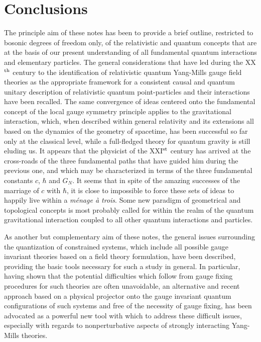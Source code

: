 \documentclass[a4paper,11pt]{article}
\begin{document}
\section{Conclusions}
\label{Sect9}

The principle aim of these notes has been to provide a brief outline,
restricted to bosonic degrees of freedom only, of the
relativistic and quantum concepts that are at the basis of our present
understanding of all fundamental quantum interactions and elementary
particles. The general considerations that have led during the XX$^{\rm th}$
century to the identification of relativistic quantum Yang-Mills gauge field
theories as the appropriate framework for a consistent causal and
quantum unitary description of relativistic quantum point-particles
and their interactions have been recalled. The same convergence of
ideas centered onto the fundamental concept of the local gauge
symmetry principle applies to the gravitational interaction, which,
when des\-cri\-bed within general relativity and its extensions all based
on the dynamics of the geometry of spacetime, has been successful so far
only at the classical level, while a full-fledged theory for quantum
gravity is still eluding us. It appears that the physicist of the 
XXI$^{\rm st}$ century has arrived at the cross-roads of the three fundamental
paths that have guided him during the previous one, and which may be
characterized in terms of the three fundamental constants $c$, $\hbar$ and
$G_N$. It seems that in spite of the amazing successes of the marriage
of $c$ with $\hbar$, it is close to impossible to force these sets of ideas 
to happily live within a {\sl m\'enage \`a trois\/}. Some new paradigm
of geometrical and topological concepts is most probably called for within
the realm of the quantum gravitational interaction coupled to all other
quantum interactions and particles.

As another but complementary aim of these notes, the general issues surrounding
the quantization of constrained systems, which include all possible gauge
invariant theories based on a field theory formulation, have been described,
providing the basic tools necessary for such a study in general. In particular,
having shown that the potential difficulties which follow from gauge fixing
procedures for such theories are often unavoidable, an alternative and recent
approach based on a physical projector\cite{Klaud1} onto the gauge invariant 
quantum configurations of such systems and free of the necessity of gauge 
fixing, has been advocated as a powerful new tool with which to address these 
difficult issues, especially with regards to nonperturbative aspects of 
strongly interacting Yang-Mills theories.
\end{document}
